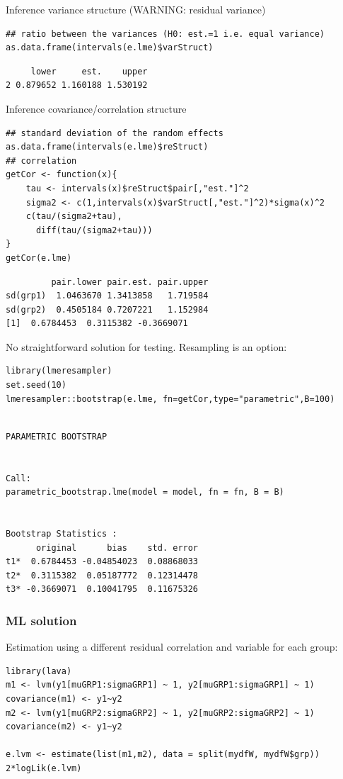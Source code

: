 \documentclass{article}
\begin{document}
\clearpage

Inference variance structure (WARNING: residual variance)
\lstset{language=r,label= ,caption= ,captionpos=b,numbers=none}
\begin{lstlisting}
## ratio between the variances (H0: est.=1 i.e. equal variance)
as.data.frame(intervals(e.lme)$varStruct)
\end{lstlisting}

\begin{verbatim}
     lower     est.    upper
2 0.879652 1.160188 1.530192
\end{verbatim}


Inference covariance/correlation structure
\lstset{language=r,label= ,caption= ,captionpos=b,numbers=none}
\begin{lstlisting}
## standard deviation of the random effects
as.data.frame(intervals(e.lme)$reStruct)
## correlation
getCor <- function(x){
    tau <- intervals(x)$reStruct$pair[,"est."]^2
    sigma2 <- c(1,intervals(x)$varStruct[,"est."]^2)*sigma(x)^2
    c(tau/(sigma2+tau),
      diff(tau/(sigma2+tau)))
}
getCor(e.lme)
\end{lstlisting}

\begin{verbatim}
         pair.lower pair.est. pair.upper
sd(grp1)  1.0463670 1.3413858   1.719584
sd(grp2)  0.4505184 0.7207221   1.152984
[1]  0.6784453  0.3115382 -0.3669071
\end{verbatim}


No straightforward solution for testing. Resampling is an option:
\lstset{language=r,label= ,caption= ,captionpos=b,numbers=none}
\begin{lstlisting}
library(lmeresampler)
set.seed(10)
lmeresampler::bootstrap(e.lme, fn=getCor,type="parametric",B=100)
\end{lstlisting}

\begin{verbatim}

PARAMETRIC BOOTSTRAP


Call:
parametric_bootstrap.lme(model = model, fn = fn, B = B)


Bootstrap Statistics :
      original      bias    std. error
t1*  0.6784453 -0.04854023  0.08868033
t2*  0.3115382  0.05187772  0.12314478
t3* -0.3669071  0.10041795  0.11675326
\end{verbatim}

\clearpage

\subsubsection{ML solution}
\label{sec:org4f85754}
Estimation using a different residual correlation and variable for each group:
\lstset{language=r,label= ,caption= ,captionpos=b,numbers=none}
\begin{lstlisting}
library(lava)
m1 <- lvm(y1[muGRP1:sigmaGRP1] ~ 1, y2[muGRP1:sigmaGRP1] ~ 1)
covariance(m1) <- y1~y2
m2 <- lvm(y1[muGRP2:sigmaGRP2] ~ 1, y2[muGRP2:sigmaGRP2] ~ 1)
covariance(m2) <- y1~y2

e.lvm <- estimate(list(m1,m2), data = split(mydfW, mydfW$grp))
2*logLik(e.lvm)
\end{lstlisting}
\end{document}
